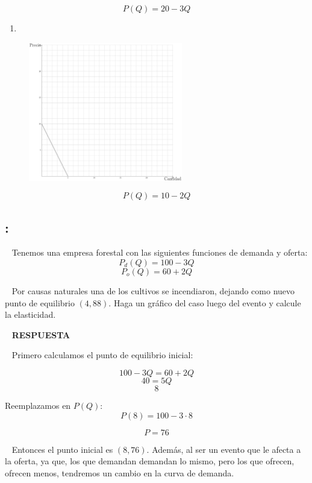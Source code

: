 \documentclass[
  letterpaper,
  DIV=11,
  numbers=noendperiod]{scrreport}
\providecommand{\tightlist}{%
  \setlength{\itemsep}{0pt}\setlength{\parskip}{0pt}}\usepackage{longtable,booktabs,array}
\begin{document}
\[
P(Q)=20-3Q
\]

\newpage

\begin{enumerate}
\def\labelenumi{\arabic{enumi})}
\setcounter{enumi}{2}
\tightlist
\item
\end{enumerate}

\begin{figure}

{\centering \includegraphics[width=0.6\textwidth,height=\textheight]{8ej_pauta_files/figure-pdf/unnamed-chunk-8-1.pdf}

}

\end{figure}

\[
P(Q)=10-2Q
\]

\hypertarget{section-28}{%
\subsection{:}\label{section-28}}

~ Tenemos una empresa forestal con las siguientes funciones de demanda y
oferta: \[
P_d(Q)=100-3Q
\] \[
P_o(Q)=60+2Q
\]

~ Por causas naturales una de los cultivos se incendiaron, dejando como
nuevo punto de equilibrio \((4,88)\). Haga un gráfico del caso luego del
evento y calcule la elasticidad.

~ \textbf{RESPUESTA}

~ Primero calculamos el punto de equilibrio inicial:

\[
100-3Q=60+2Q
\] \[
40=5Q
\] \[
8
\]

Reemplazamos en \(P(Q)\): \[
P(8)=100-3\cdot 8
\]

\[
P = 76
\]

~ Entonces el punto inicial es \((8,76)\). Además, al ser un evento que
le afecta a la oferta, ya que, los que demandan demandan lo mismo, pero
los que ofrecen, ofrecen menos, tendremos un cambio en la curva de
demanda.
\end{document}
